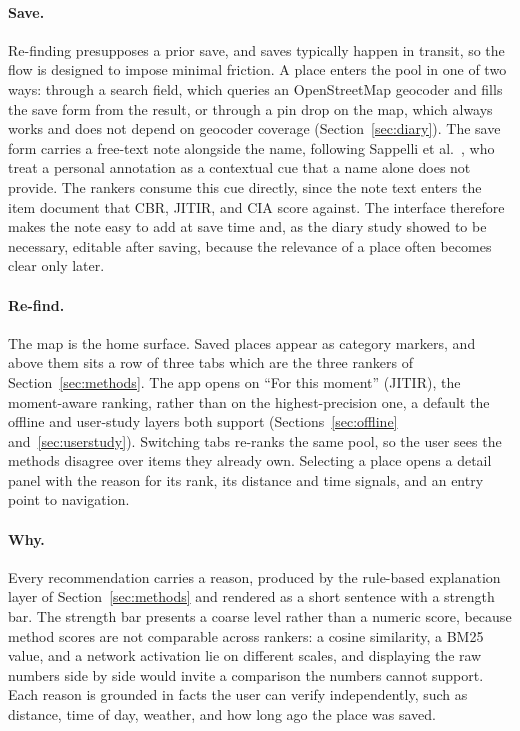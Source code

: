 \documentclass[acmlarge]{acmart}
\begin{document}
\paragraph{Save.}
Re-finding presupposes a prior save, and saves typically happen in
transit, so the flow is designed to impose minimal friction. A place enters the pool in one of two ways: through
a search field, which queries an OpenStreetMap geocoder and fills the save
form from the result, or through a pin drop on the map, which always works
and does not depend on geocoder coverage (Section~\ref{sec:diary}). The
save form carries a free-text note alongside the name, following
Sappelli et al.~\cite{sappelli2017}, who treat a personal annotation as a
contextual cue that a name alone does not provide. The rankers consume this
cue directly, since the note text enters the item document that CBR, JITIR,
and CIA score against. The interface therefore makes the note easy to add
at save time and, as the diary study showed to be necessary, editable after
saving, because the relevance of a place often becomes clear only later.

\paragraph{Re-find.}
The map is the home surface. Saved places appear as category markers, and
above them sits a row of three tabs which are the three rankers of
Section~\ref{sec:methods}. The app opens on ``For this moment'' (JITIR),
the moment-aware ranking, rather than on the highest-precision one, a
default the offline and user-study layers both support
(Sections~\ref{sec:offline} and~\ref{sec:userstudy}). Switching tabs
re-ranks the same pool, so the user sees the methods disagree over items
they already own. Selecting a place opens a detail panel with the reason
for its rank, its distance and time signals, and an entry point to
navigation.

\paragraph{Why.}
Every recommendation carries a reason, produced by the rule-based
explanation layer of Section~\ref{sec:methods} and rendered as a short
sentence with a strength bar. The strength bar presents a coarse level rather than a numeric score,
because method scores are not comparable across rankers: a cosine
similarity, a BM25 value, and a network activation lie on different scales,
and displaying the raw numbers side by side would invite a comparison the
numbers cannot support. Each reason is grounded in facts the user can
verify independently, such as distance, time of day, weather, and how long
ago the place was saved.
\end{document}
